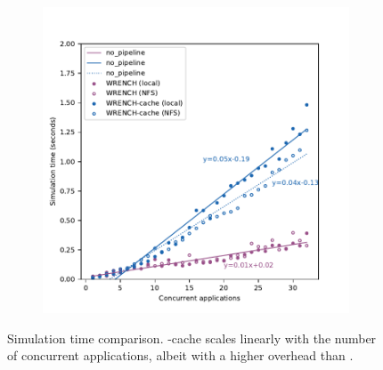 \begin{figure}[!h]
    \begin{subfigure}{\columnwidth}
        \centering
        \includegraphics[width=0.8\linewidth]{result/multi/figures/simulation_time.pdf}
    \end{subfigure}
    \caption{Simulation time comparison. \wrench-cache scales
    linearly with the number of concurrent applications, albeit
    with a higher overhead than \wrench.}
    \label{fig:multi_time}
\end{figure}